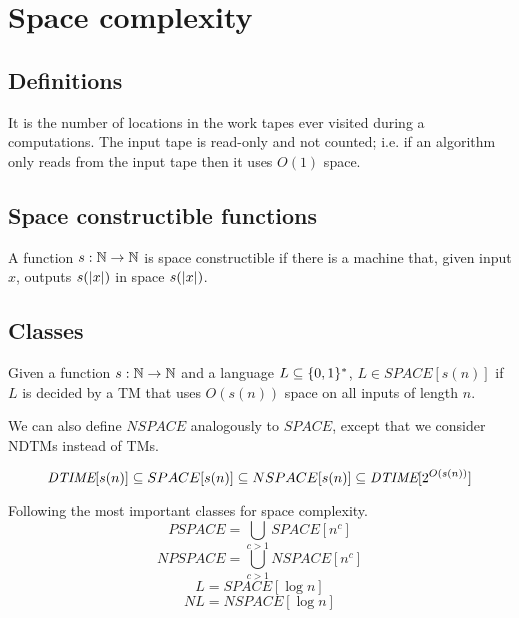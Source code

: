 \section{Space complexity}\label{sec:space}

\subsection{Definitions}\label{subsec:space_def}

    \begin{definition}[Space]\label{def:space}
        It is the number of locations in the work tapes ever visited during a computations.
        The input tape is read-only and not counted; i.e. if an algorithm only reads from the input tape then it uses $O(1)$ space.
    \end{definition}


\subsection{Space constructible functions}\label{subsec:space_construct}
    \begin{definition}\label{def:space_constr_func}
        A function $s : \mathbb{N} \rightarrow \mathbb{N}$ is space constructible if there is a machine that, given input $x$, outputs $s(\vert x \vert)$ in space $s(\vert x \vert)$.
    \end{definition}

\subsection{Classes}\label{subsec:space_classes}

    \begin{definition}
        Given a function $s : \mathbb{N} \rightarrow \mathbb{N}$ and a language $L \subseteq \{ 0,1 \}^*$, $L \in SPACE[s(n)]$ if
        $L$ is decided by a TM that uses $O(s(n))$ space on all inputs of length $n$.
    \end{definition}

    We can also define $NSPACE$ analogously to $SPACE$, except that we consider NDTMs instead of TMs.

    \begin{lemma}
        \[ \textit{DTIME}[s(n)] \subseteq SPACE[s(n)] \subseteq NSPACE[s(n)] \subseteq \textit{DTIME}[2^{O(s(n))}] \]
    \end{lemma}

    Following the most important classes for space complexity.
    \[ PSPACE = \bigcup_{c > 1} SPACE[n^c] \]
    \[ NPSPACE = \bigcup_{c > 1} NSPACE[n^c] \]
    \[ L =  SPACE[\log n] \]
    \[ NL = NSPACE[\log n] \]

